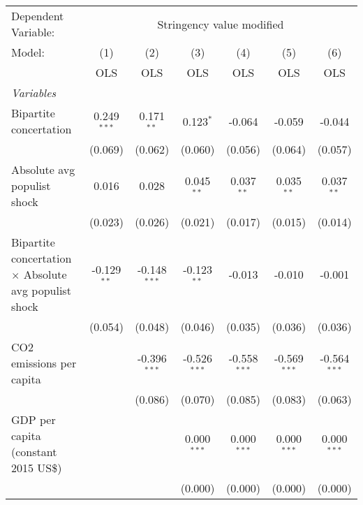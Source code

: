 
\begingroup
\centering
\begin{tabular}{lcccccc}
   \toprule
   Dependent Variable: & \multicolumn{6}{c}{Stringency value modified}\\
   Model:                                                       & (1)           & (2)            & (3)            & (4)            & (5)            & (6)\\  
                                                                &  OLS          & OLS            & OLS            & OLS            & OLS            & OLS\\  
   \midrule
   \emph{Variables}\\
   Bipartite concertation                                       & 0.249$^{***}$ & 0.171$^{**}$   & 0.123$^{*}$    & -0.064         & -0.059         & -0.044\\   
                                                                & (0.069)       & (0.062)        & (0.060)        & (0.056)        & (0.064)        & (0.057)\\   
   Absolute avg populist shock                                  & 0.016         & 0.028          & 0.045$^{**}$   & 0.037$^{**}$   & 0.035$^{**}$   & 0.037$^{**}$\\   
                                                                & (0.023)       & (0.026)        & (0.021)        & (0.017)        & (0.015)        & (0.014)\\   
   Bipartite concertation $\times$ Absolute avg populist shock  & -0.129$^{**}$ & -0.148$^{***}$ & -0.123$^{**}$  & -0.013         & -0.010         & -0.001\\   
                                                                & (0.054)       & (0.048)        & (0.046)        & (0.035)        & (0.036)        & (0.036)\\   
   CO2 emissions per capita                                     &               & -0.396$^{***}$ & -0.526$^{***}$ & -0.558$^{***}$ & -0.569$^{***}$ & -0.564$^{***}$\\   
                                                                &               & (0.086)        & (0.070)        & (0.085)        & (0.083)        & (0.063)\\   
   GDP per capita (constant 2015 US\$)                          &               &                & 0.000$^{***}$  & 0.000$^{***}$  & 0.000$^{***}$  & 0.000$^{***}$\\   
                                                                &               &                & (0.000)        & (0.000)        & (0.000)        & (0.000)\\   

\end{tabular}
